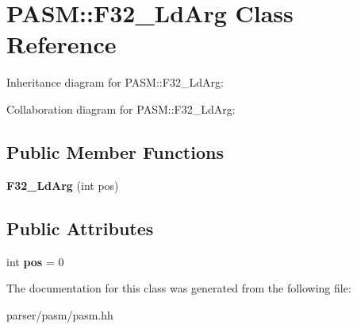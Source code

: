 \hypertarget{classPASM_1_1F32__LdArg}{}\section{P\+A\+SM\+:\+:F32\+\_\+\+Ld\+Arg Class Reference}
\label{classPASM_1_1F32__LdArg}


Inheritance diagram for P\+A\+SM\+:\+:F32\+\_\+\+Ld\+Arg\+:


Collaboration diagram for P\+A\+SM\+:\+:F32\+\_\+\+Ld\+Arg\+:
\subsection*{Public Member Functions}
\begin{DoxyCompactItemize}
\item 
\mbox{\label{classPASM_1_1F32__LdArg_ac4d7fe07c3422211f837f72064f2f3eb}} 
{\bfseries F32\+\_\+\+Ld\+Arg} (int pos)
\end{DoxyCompactItemize}
\subsection*{Public Attributes}
\begin{DoxyCompactItemize}
\item 
\mbox{\label{classPASM_1_1F32__LdArg_aaec6112a0200745af1fa502182ed5530}} 
int {\bfseries pos} = 0
\end{DoxyCompactItemize}


The documentation for this class was generated from the following file\+:\begin{DoxyCompactItemize}
\item 
parser/pasm/pasm.\+hh\end{DoxyCompactItemize}
